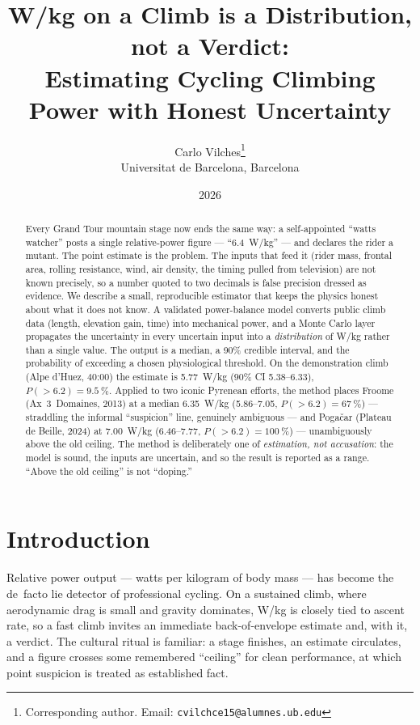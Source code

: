 \documentclass[11pt]{article}
\title{\textbf{W/kg on a Climb is a Distribution, not a Verdict:\\
Estimating Cycling Climbing Power with Honest Uncertainty}}
\author{Carlo Vilches\thanks{Corresponding author.
Email: \texttt{cvilchce15@alumnes.ub.edu}}\\[2pt]
\normalsize Universitat de Barcelona, Barcelona}
\date{2026}
\begin{document}
\maketitle

\begin{abstract}
\noindent
Every Grand Tour mountain stage now ends the same way: a self-appointed
``watts watcher'' posts a single relative-power figure --- ``\num{6.4}~W/kg'' ---
and declares the rider a mutant. The point estimate is the problem. The inputs
that feed it (rider mass, frontal area, rolling resistance, wind, air density,
the timing pulled from television) are not known precisely, so a number quoted
to two decimals is false precision dressed as evidence. We describe a small,
reproducible estimator that keeps the physics honest about what it does not
know. A validated power-balance model \citep{martin1998} converts public climb
data (length, elevation gain, time) into mechanical power, and a Monte Carlo
layer propagates the uncertainty in every uncertain input into a
\emph{distribution} of W/kg rather than a single value. The output is a median,
a 90\% credible interval, and the probability of exceeding a chosen
physiological threshold. On the demonstration climb (Alpe d'Huez, \num{40}:00)
the estimate is \num{5.77}~W/kg (90\% CI \numrange{5.38}{6.33}),
$P(>\!6.2)=\SI{9.5}{\percent}$. Applied to two iconic Pyrenean efforts, the
method places Froome (Ax~3~Domaines, 2013) at a median \num{6.35}~W/kg
(\numrange{5.86}{7.05}, $P(>\!6.2)=\SI{67}{\percent}$) --- straddling the
informal ``suspicion'' line, genuinely ambiguous --- and Pogačar (Plateau de
Beille, 2024) at \num{7.00}~W/kg (\numrange{6.46}{7.77},
$P(>\!6.2)=\SI{100}{\percent}$) --- unambiguously above the old ceiling. The
method is deliberately one of \emph{estimation, not accusation}: the model is
sound, the inputs are uncertain, and so the result is reported as a range. ``Above the old ceiling'' is not ``doping.''
\end{abstract}

\section{Introduction}

Relative power output --- watts per kilogram of body mass --- has become the
de~facto lie detector of professional cycling. On a sustained climb, where
aerodynamic drag is small and gravity dominates, W/kg is closely tied to ascent
rate, so a fast climb invites an immediate back-of-envelope estimate and, with
it, a verdict. The cultural ritual is familiar: a stage finishes, an estimate
circulates, and a figure crosses some remembered ``ceiling'' for clean
performance, at which point suspicion is treated as established fact.
\end{document}
